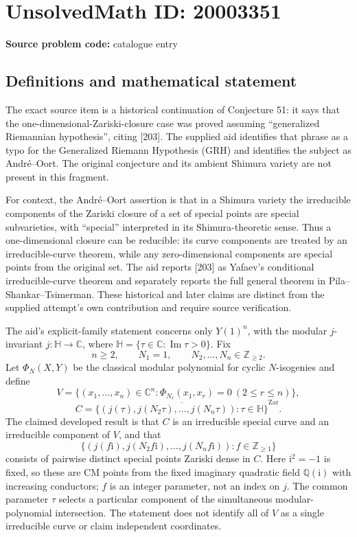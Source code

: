 \documentclass[11pt]{article}
\newcommand{\Z}{\mathbb{Z}}
\newcommand{\Q}{\mathbb{Q}}
\newcommand{\C}{\mathbb{C}}
\begin{document}
\section*{UnsolvedMath ID: 20003351}
\textbf{Source problem code:} catalogue entry
\subsection{Definitions and mathematical statement}
The exact source item is a historical continuation of Conjecture 51: it says that the one-dimensional-Zariski-closure case was proved assuming ``generalized Riemannian hypothesis'', citing [203]. The supplied aid identifies that phrase as a typo for the Generalized Riemann Hypothesis (GRH) and identifies the subject as Andr\'e--Oort. The original conjecture and its ambient Shimura variety are not present in this fragment.

For context, the Andr\'e--Oort assertion is that in a Shimura variety the irreducible components of the Zariski closure of a set of special points are special subvarieties, with ``special'' interpreted in its Shimura-theoretic sense. Thus a one-dimensional closure can be reducible: its curve components are treated by an irreducible-curve theorem, while any zero-dimensional components are special points from the original set. The aid reports [203] as Yafaev's conditional irreducible-curve theorem and separately reports the full general theorem in Pila--Shankar--Tsimerman. These historical and later claims are distinct from the supplied attempt's own contribution and require source verification.

The aid's explicit-family statement concerns only $Y(1)^n$, with the modular $j$-invariant $j:\mathbb H\to\C$, where $\mathbb H=\{\tau\in\C:\operatorname{Im}\tau>0\}$. Fix
\[
 n\geq2,\qquad N_1=1,\qquad N_2,\ldots,N_n\in\Z_{\geq2}.
\]
Let $\Phi_N(X,Y)$ be the classical modular polynomial for cyclic $N$-isogenies and define
\[
 V=\{(x_1,\ldots,x_n)\in\C^n:
             \Phi_{N_r}(x_1,x_r)=0\ (2\leq r\leq n)\},
\]
\[
 C=\overline{\{(j(\tau),j(N_2\tau),\ldots,j(N_n\tau)):
                 \tau\in\mathbb H\}}^{\mathrm{Zar}}.
\]
The claimed developed result is that $C$ is an irreducible special curve and an irreducible component of $V$, and that
\[
 \{(j(f\mathrm i),j(N_2f\mathrm i),\ldots,j(N_nf\mathrm i)):
                        f\in\Z_{\geq1}\}
\]
consists of pairwise distinct special points Zariski dense in $C$. Here $\mathrm i^2=-1$ is fixed, so these are CM points from the fixed imaginary quadratic field $\Q(\mathrm i)$ with increasing conductors; $f$ is an integer parameter, not an index on $j$. The common parameter $\tau$ selects a particular component of the simultaneous modular-polynomial intersection. The statement does not identify all of $V$ as a single irreducible curve or claim independent coordinates.
\end{document}
